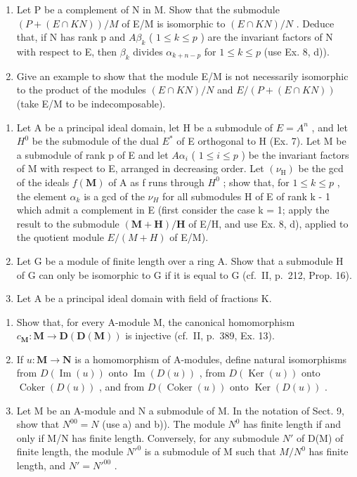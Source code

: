 \begin{enumerate}
\def\labelenumi{\alph{enumi})}
\item
  Let P be a complement of N in M. Show that the submodule \((P + (E \cap KN))/M\) of E/M is isomorphic to \((E \cap KN)/N\) . Deduce that, if N has rank p and \(A\beta_{k}\) ( \(1 \leqslant k \leqslant p\) ) are the invariant factors of N with respect to E, then \(\beta_{k}\) divides \(\alpha_{k+n-p}\) for \(1 \leqslant k \leqslant p\) (use Ex. 8, d)).
\item
  Give an example to show that the module E/M is not necessarily isomorphic to the product of the modules \((E \cap KN)/N\) and \(E/(P + (E \cap KN))\) (take E/M to be indecomposable).
\end{enumerate}

\begin{enumerate}
\def\labelenumi{\arabic{enumi})}
\setcounter{enumi}{10}
\item
  Let A be a principal ideal domain, let H be a submodule of \(E = A^{n}\) , and let \(H^{0}\) be the submodule of the dual \(E^{*}\) of E orthogonal to H (Ex. 7). Let M be a submodule of rank p of E and let \(A\alpha_{i}\) ( \(1 \leqslant i \leqslant p\) ) be the invariant factors of M with respect to E, arranged in decreasing order. Let \((\nu_{\mathrm{H}})\) be the gcd of the ideals \(f(\mathbf{M})\) of A as f runs through \(H^{0}\) ; show that, for \(1 \leqslant k \leqslant p\) , the element \(\alpha_{k}\) is a gcd of the \(\nu_{H}\) for all submodules H of E of rank k - 1 which admit a complement in E (first consider the case k = 1; apply the result to the submodule \((\mathbf{M} + \mathbf{H})/\mathbf{H}\) of E/H, and use Ex. 8, d), applied to the quotient module \(E/(M + H)\) of E/M).
\item
  Let G be a module of finite length over a ring A. Show that a submodule H of G can only be isomorphic to G if it is equal to G (cf.~II, p.~212, Prop. 16).
\item
  Let A be a principal ideal domain with field of fractions K.
\end{enumerate}

\begin{enumerate}
\def\labelenumi{\alph{enumi})}
\item
  Show that, for every A-module M, the canonical homomorphism \(c_{\mathbf{M}}: \mathbf{M} \to \mathbf{D}(\mathbf{D}(\mathbf{M}))\) is injective (cf.~II, p.~389, Ex. 13).
\item
  If \(u: \mathbf{M} \to \mathbf{N}\) is a homomorphism of A-modules, define natural isomorphisms from \(D(\operatorname{Im}(u))\) onto \(\operatorname{Im}(D(u))\) , from \(D(\operatorname{Ker}(u))\) onto \(\operatorname{Coker}(D(u))\) , and from \(D(\operatorname{Coker}(u))\) onto \(\operatorname{Ker}(D(u))\) .
\item
  Let M be an A-module and N a submodule of M. In the notation of Sect. 9, show that \(N^{00} = N\) (use a) and b)). The module \(N^{0}\) has finite length if and only if M/N has finite length. Conversely, for any submodule \(N'\) of D(M) of finite length, the module \(N'^{0}\) is a submodule of M such that \(M/N^{0}\) has finite length, and \(N' = N'^{00}\) .
\end{enumerate}

